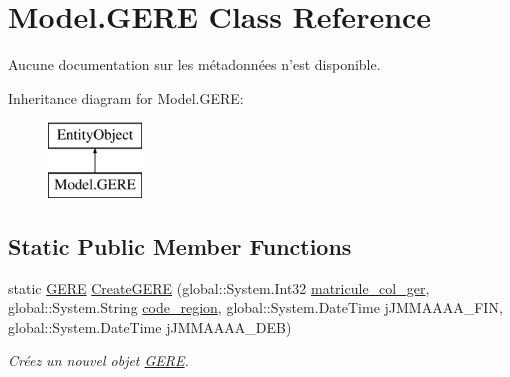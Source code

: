 \hypertarget{class_model_1_1_g_e_r_e}{\section{Model.\-G\-E\-R\-E Class Reference}
\label{class_model_1_1_g_e_r_e}
}


Aucune documentation sur les métadonnées n'est disponible.  


Inheritance diagram for Model.\-G\-E\-R\-E\-:\begin{figure}[H]
\begin{center}
\leavevmode
\includegraphics[height=2.000000cm]{class_model_1_1_g_e_r_e}
\end{center}
\end{figure}
\subsection*{Static Public Member Functions}
\begin{DoxyCompactItemize}
\item 
static \hyperlink{class_model_1_1_g_e_r_e}{G\-E\-R\-E} \hyperlink{class_model_1_1_g_e_r_e_a08f4c410666eaa384a4df6c5af56caeb}{Create\-G\-E\-R\-E} (global\-::\-System.\-Int32 \hyperlink{class_model_1_1_g_e_r_e_a6976ff90929344b89d6329df4f8b7648}{matricule\-\_\-col\-\_\-ger}, global\-::\-System.\-String \hyperlink{class_model_1_1_g_e_r_e_ab75ef8c99d225e8c5e4cf95012d54287}{code\-\_\-region}, global\-::\-System.\-Date\-Time j\-J\-M\-M\-A\-A\-A\-A\-\_\-\-F\-I\-N, global\-::\-System.\-Date\-Time j\-J\-M\-M\-A\-A\-A\-A\-\_\-\-D\-E\-B)
\begin{DoxyCompactList}\small\item\em Créez un nouvel objet \hyperlink{class_model_1_1_g_e_r_e}{G\-E\-R\-E}. \end{DoxyCompactList}\end{DoxyCompactItemize}
